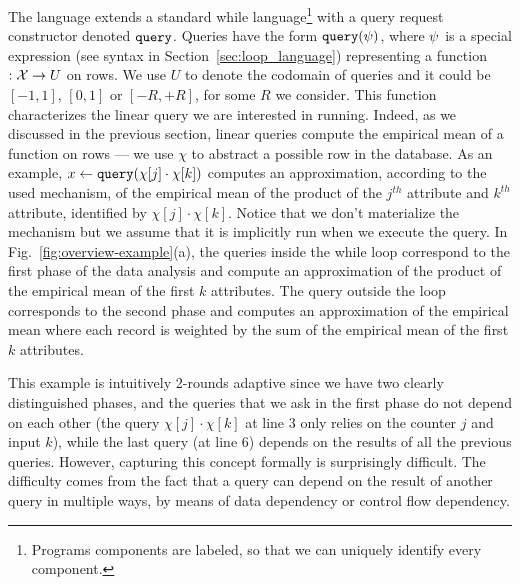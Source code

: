 The {\THESYSTEM} language extends a standard while language\footnote{Programs components are labeled, so that we can uniquely identify every component.} with a query request constructor denoted ${\tt query}$. Queries have the form ${\tt query}(\psi)$, where $\psi$ is a special expression (see syntax in Section~\ref{sec:loop_language}) representing a function $: \mathcal{X} \to U$ on rows.
We use $U$ to denote the codomain of queries and it could be $[-1,1]$, $[0,1]$ or $[-R,+R]$, for some $R$ we consider. This function characterizes the linear query we are interested in running. Indeed, as we discussed in the previous section, linear queries compute the empirical mean of a function on rows --- we use $\chi$ to abstract a possible row in the database.
 As an example, $x \leftarrow {\tt query}(\chi[j] \cdot \chi[k])$ computes an approximation, according to the used mechanism, of the empirical mean of the product of the $j^{th}$ attribute and $k^{th}$ attribute, identified by $\chi[j] \cdot \chi[k]$. Notice that we don't materialize the mechanism but we assume that it is implicitly run when we execute the query. 
 In Fig.~\ref{fig:overview-example}(a), the queries inside the while loop correspond to the first phase of the data analysis and compute an approximation of 
the product of the empirical mean of the first $k$ attributes. 
The query outside the loop corresponds to the second phase and computes an approximation of the empirical mean where each record is weighted by the sum of the empirical mean of the first $k$ attributes.


This example is intuitively 2-rounds adaptive since we have two clearly distinguished phases, and the queries that we ask in the first phase do not depend on each other (the query $\chi[j] \cdot \chi[k]$ at line $3$ only relies on the counter $j$ and input $k$), while the last query 
(at line 6) depends on the results of all the previous queries. 
However, capturing this concept formally is surprisingly difficult. The difficulty comes from the fact that a query can depend on the result of another query in multiple ways, by means of data dependency or control flow dependency.

